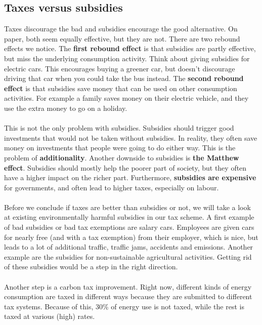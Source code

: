 \documentclass[../summary.tex]{subfiles}
\begin{document}
\subsection{Taxes versus subsidies}
Taxes discourage the bad and subsidies encourage the good alternative. On paper, both seem equally effective, but they are not. There are two rebound effects we notice. The \textbf{first rebound effect} is that subsidies are partly effective, but miss the underlying consumption activity. Think about giving subsidies for electric cars. This encourages buying a greener car, but doesn't discourage driving that car when you could take the bus instead. The \textbf{second rebound effect} is that subsidies save money that can be used on other consumption activities. For example a family saves money on their electric vehicle, and they use the extra money to go on a holiday.
\\\\
This is not the only problem with subsidies. Subsidies should trigger good investments that would not be taken without subsidies. In reality, they often save money on investments that people were going to do either way. This is the problem of \textbf{additionality}. Another downside to subsidies is \textbf{the Matthew effect}. Subsidies should mostly help the poorer part of society, but they often have a higher impact on the richer part. Furthermore, \textbf{subsidies are expensive} for governments, and often lead to higher taxes, especially on labour.
\\\\
Before we conclude if taxes are better than subsidies or not, we will take a look at existing environmentally harmful subsidies in our tax scheme. A first example of bad subsidies or bad tax exemptions are salary cars. Employees are given cars for nearly free (and with a tax exemption) from their employer, which is nice, but leads to a lot of additional traffic, traffic jams, accidents and emissions. Another example are the subsidies for non-sustainable agricultural activities. Getting rid of these subsidies would be a step in the right direction.
\\\\
Another step is a carbon tax improvement. Right now, different kinds of energy consumption are taxed in different ways because they are submitted to different tax systems. Because of this, 30\% of energy use is not taxed, while the rest is taxed at various (high) rates.
\end{document}
